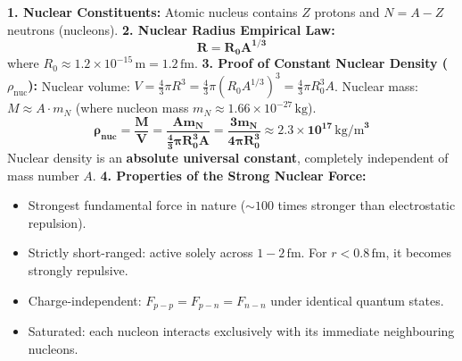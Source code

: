 \documentclass[10pt,twoside,openright]{book}
\begin{document}
\begin{conceptbox}
\textbf{1. Nuclear Constituents:}
Atomic nucleus contains $Z$ protons and $N = A - Z$ neutrons (nucleons).
\textbf{2. Nuclear Radius Empirical Law:}
\begin{equation}
  \mathbf{R = R_0 A^{1/3}}
\end{equation}
where $R_0 \approx 1.2 \times 10^{-15}\,\mathrm{m} = 1.2\,\mathrm{fm}$.
\textbf{3. Proof of Constant Nuclear Density ($\rho_{\text{nuc}}$):}
Nuclear volume: $V = \frac{4}{3}\pi R^3 = \frac{4}{3}\pi (R_0 A^{1/3})^3 = \frac{4}{3}\pi R_0^3 A$.
Nuclear mass: $M \approx A \cdot m_N$ (where nucleon mass $m_N \approx 1.66 \times 10^{-27}\,\mathrm{kg}$).
\begin{equation}
  \mathbf{\rho_{\text{nuc}} = \frac{M}{V} = \frac{A m_N}{\frac{4}{3}\pi R_0^3 A} = \frac{3 m_N}{4\pi R_0^3} \approx 2.3 \times 10^{17}\,\mathrm{kg/m}^3}
\end{equation}
Nuclear density is an \textbf{absolute universal constant}, completely independent of mass number $A$.
\textbf{4. Properties of the Strong Nuclear Force:}
\begin{itemize}
  \item Strongest fundamental force in nature ($\sim 100$ times stronger than electrostatic repulsion).
  \item Strictly short-ranged: active solely across $1 - 2\,\mathrm{fm}$. For $r < 0.8\,\mathrm{fm}$, it becomes strongly repulsive.
  \item Charge-independent: $F_{p-p} = F_{p-n} = F_{n-n}$ under identical quantum states.
  \item Saturated: each nucleon interacts exclusively with its immediate neighbouring nucleons.
\end{itemize}
\end{conceptbox}
\end{document}
